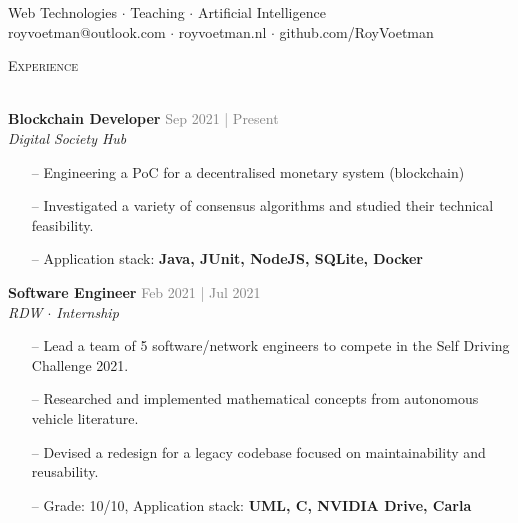\documentclass[a4paper]{article}
\newcommand{\lineunder} {
    \vspace*{-8pt} \\
    \hspace*{-18pt} \hrulefill \\
}
\newcommand{\header} [1] {
    {\hspace*{-18pt}\vspace*{6pt} \textsc{#1}}
    \vspace*{-6pt} \lineunder
}
\newcommand{\roundpic}[4][]{
  \tikz\node [circle, minimum width = #2,
    path picture = {
      \node [#1] at (path picture bounding box.center) {
        \texttt{[image: \#4]}};
    }] {};}
\begin{document}
\vspace*{-40pt}

    

\vspace*{-10pt}

\vspace{10mm}

\begin{center}
    \centering
    \raisebox{-0.5\height}{\roundpic{2cm}{2cm}{avatar.jpg}}
    \hspace*{.1in}
    
    \vspace*{10pt}
    {Web Technologies $\cdot$ Teaching $\cdot$ Artificial Intelligence}\\
    \vspace*{3pt}
	royvoetman@outlook.com $\cdot$ royvoetman.nl $\cdot$ github.com/RoyVoetman\\
\end{center}

\vspace{5mm}

\header{Experience}
\vspace{1mm}

\textbf{Blockchain Developer} \hfill \textcolor{gray}{Sep 2021 | Present}\\
\textit{Digital Society Hub}\\
\vspace{-1mm}
\begin{itemize} \itemsep 1pt
    \item[--] Engineering a PoC for a decentralised monetary system (blockchain)
    \item[--] Investigated a variety of consensus algorithms and studied their technical feasibility.  
	\item[--] Application stack: \textbf{Java, JUnit, NodeJS, SQLite, Docker}
\end{itemize}

\textbf{Software Engineer} \hfill \textcolor{gray}{Feb 2021 | Jul 2021}\\
\textit{RDW $\cdot$ Internship}\\
\vspace{-1mm}
\begin{itemize} \itemsep 1pt
    \item[--] Lead a team of 5 software/network engineers to compete in the Self Driving Challenge 2021.
	\item[--] Researched and implemented mathematical concepts from autonomous vehicle literature.
    \item[--] Devised a redesign for a legacy codebase focused on maintainability and reusability.
	\item[--] Grade: 10/10, Application stack: \textbf{UML, C\scalebox{0.7}{++}, NVIDIA Drive, Carla}
\end{itemize}
\end{document}
